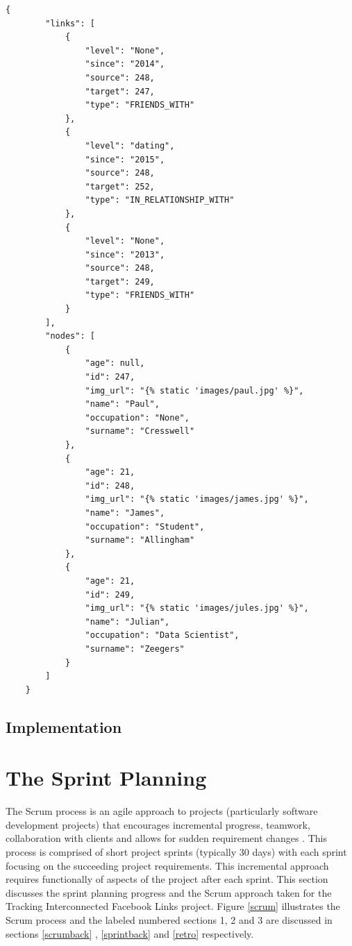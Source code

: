 \documentclass[12pt,onecolumn]{article}
\begin{document}
	\begin{lstlisting}[caption=test,captionpos=b,label=list:dbjson]
	{
	    "links": [
	        {
	            "level": "None", 
	            "since": "2014", 
	            "source": 248, 
	            "target": 247, 
	            "type": "FRIENDS_WITH"
	        }, 
	        {
	            "level": "dating", 
	            "since": "2015", 
	            "source": 248, 
	            "target": 252, 
	            "type": "IN_RELATIONSHIP_WITH"
	        }, 
	        {
	            "level": "None", 
	            "since": "2013", 
	            "source": 248, 
	            "target": 249, 
	            "type": "FRIENDS_WITH"
	        }
	    ], 
	    "nodes": [
	        {
	            "age": null, 
	            "id": 247, 
	            "img_url": "{% static 'images/paul.jpg' %}", 
	            "name": "Paul", 
	            "occupation": "None", 
	            "surname": "Cresswell"
	        }, 
	        {
	            "age": 21, 
	            "id": 248, 
	            "img_url": "{% static 'images/james.jpg' %}", 
	            "name": "James", 
	            "occupation": "Student", 
	            "surname": "Allingham"
	        }, 
	        {
	            "age": 21, 
	            "id": 249, 
	            "img_url": "{% static 'images/jules.jpg' %}", 
	            "name": "Julian", 
	            "occupation": "Data Scientist", 
	            "surname": "Zeegers"
	        }
	    ]
	}

	\end{lstlisting} 
	
	\subsection{Implementation} %
	
	\section{The Sprint Planning}
	The Scrum process is an agile approach to projects (particularly software development projects) that encourages incremental progress, teamwork, collaboration with clients and allows for sudden requirement changes \cite{Cohn}. This process is comprised of short project sprints (typically 30 days) with each sprint focusing on the succeeding project requirements. This incremental approach requires functionally of aspects of the project after each sprint. This section discusses the sprint planning progress and the Scrum approach taken for the Tracking Interconnected Facebook Links project. Figure \ref{scrum} illustrates the Scrum process and the labeled numbered sections 1, 2 and 3 are discussed in sections  \ref{scrumback} ,  \ref{sprintback} and  \ref{retro} respectively.
	
\end{document}
